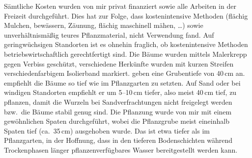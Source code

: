 \documentclass[twocolumn]{scrartcl}
\begin{document}
\begin{table}[htbp]
  \centering
  \caption{Übersicht über die verwendeten Robinien}
  \label{tab:preisuebersicht}
\end{table}

Sämtliche Kosten wurden von mir privat finanziert sowie alle Arbeiten
in der Freizeit durchgeführt. Dies hat zur Folge, dass kostenintensive
Methoden (flächig Mulchen, bewässern, Zäunung, flächig maschinell
mähen, \dots) sowie unverhältnismäßig teures Pflanzmaterial, nicht
Verwendung fand. Auf geringwüchsigen Standorten ist es ohnehin
fraglich, ob kostenintensive Methoden betriebswirtschaftlich
gerechtfertigt sind. Die Bäume wurden mittels Malerkrepp gegen Verbiss
geschützt, verschiedene Herkünfte wurden mit kurzen Streifen
verschiedenfarbigem Isolierband markiert.
\citet{ciuvat2022robinieRumaenien} geben eine Grubentiefe von 40\,cm
an. \citet[S.~164--165, 173]{vadas1911robinie} empfiehlt die Bäume so
tief wie im Pflanzgarten zu setzten. Auf Sand oder bei windigen
Standorten empfiehlt er um 5--10\,cm tiefer, also meist 40\,cm tief,
zu pflanzen, damit die Wurzeln bei Sandverfrachtungen nicht freigelegt
werden bzw.\ die Bäume stabil genug sind. Die Pflanzung wurde von mir
mit einem gewöhnlichen Spaten durchgeführt, wobei die Pflanzgrube
meist eineinhalb Spaten tief (ca.~35\,cm) ausgehoben wurde. Das ist
etwa tiefer als im Pflanzgarten, in der Hoffnung, dass in den tieferen
Bodenschichten während Trockenphasen länger pflanzenverfügbares Wasser
bereitgestellt werden kann.
\end{document}
